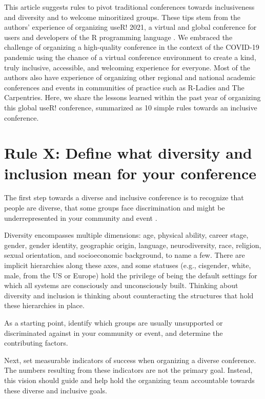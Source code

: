 \documentclass[10pt,letterpaper]{article}
\begin{document}
This article suggests rules to pivot traditional conferences towards inclusiveness and diversity and to welcome minoritized groups. These tips stem from the authors' experience of organizing useR! 2021, a virtual and global conference for users and developers of the R programming language \cite{r_core_team_2021}. We embraced the challenge of organizing a high-quality conference in the context of the COVID-19 pandemic using the chance of a virtual conference environment to create a kind, truly inclusive, accessible, and welcoming experience for everyone. Most of the authors also have experience of  organizing other regional and national academic conferences and events in communities of practice such as R-Ladies and The Carpentries. Here, we share the lessons learned within the past year of organizing this global useR! conference, summarized as 10 simple rules towards an inclusive conference.

\section{Rule X: Define what diversity and inclusion mean for your conference}

The first step towards a diverse and inclusive conference is to recognize that people are diverse, that some groups face discrimination and might be underrepresented in your community and event \cite{timperley_he_2020}. 

Diversity encompasses multiple dimensions: age, physical ability, career stage, gender, gender identity,  geographic origin, language, neurodiversity, race, religion, sexual orientation, and socioeconomic background, to name a few. There are implicit hierarchies along these axes, and some statuses (e.g., cisgender, white, male, from the US or Europe) hold the privilege of being the default settings for which all systems are consciously and unconsciously built. Thinking about diversity and inclusion is thinking about counteracting the structures that hold these hierarchies in place.

As a starting point, identify which groups are usually unsupported or discriminated against in your community or event, and determine the contributing factors.

Next, set measurable indicators of success when organizing a diverse conference. The numbers resulting from these indicators are not the primary goal. Instead, this vision should guide and help hold the organizing team accountable towards these diverse and inclusive goals.
\end{document}
